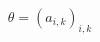 \documentclass[preview]{standalone}
\begin{document}
\begin{align*}
\theta  = (a_{i,k})_{i,k}
\end{align*}
\end{document}
